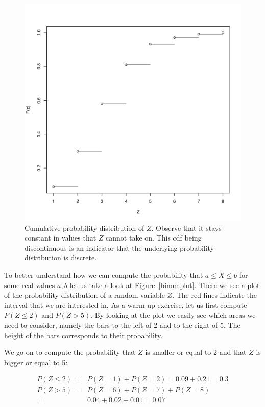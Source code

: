 \begin{figure}
\center
\includegraphics[scale=.4]{cdf.png}
\caption{Cumulative probability distribution of $ Z $. Observe that it stays constant in values that $ Z $ cannot take on. This cdf being discontinuous is an indicator
that the underlying probability distribution is discrete.}
\label{cdfPlot}
\end{figure}

To better understand how we can compute the probability that $ a \leq X \leq b $ for some real values $ a,b $ let us take a 
look at Figure~\ref{binomplot}. There we see a plot of the probability distribution of a random variable $ Z $. The red lines
indicate the interval that we are interested in. As a warm-up exercise, let us first compute $ P(Z \leq 2) $ and 
$ P(Z > 5) $. By looking at the plot we easily see which areas we need to consider, namely the bars to the left of 2
and to the right of 5. The height of the bars corresponds to their probability. 

We go on to compute the probability that $ Z $ is smaller or equal to 2 and that $ Z $ is bigger or equal to 5:

\begin{align}
P(Z \leq 2) =& P(Z=1) + P(Z=2) = 0.09 + 0.21 = 0.3 \\
P(Z > 5) =& P(Z=6) + P(Z=7) + P(Z=8) \\ 
=& 0.04 + 0.02 + 0.01 = 0.07 \nonumber
\end{align} 

